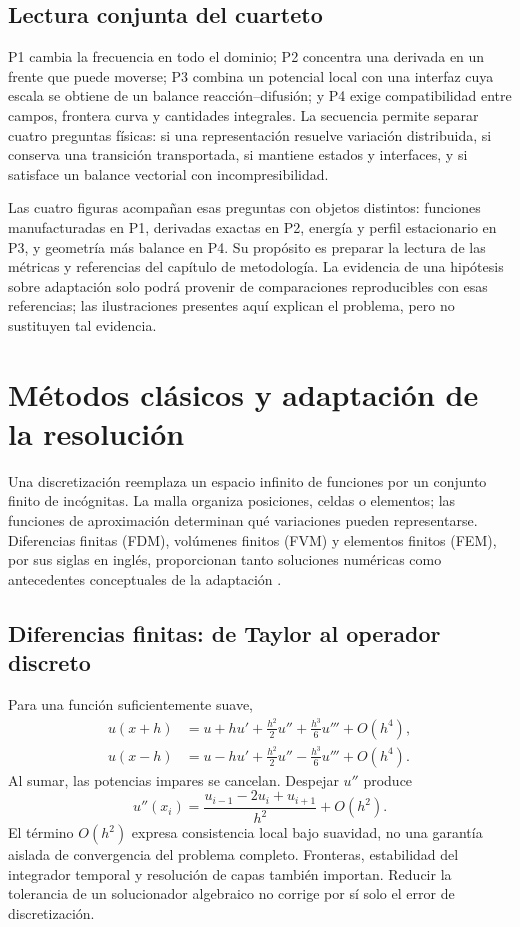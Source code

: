\subsection{Lectura conjunta del cuarteto}

P1 cambia la frecuencia en todo el dominio; P2 concentra una derivada en un
frente que puede moverse; P3 combina un potencial local con una interfaz cuya
escala se obtiene de un balance reacción--difusión; y P4 exige compatibilidad
entre campos, frontera curva y cantidades integrales. La secuencia permite
separar cuatro preguntas físicas: si una representación resuelve variación
distribuida, si conserva una transición transportada, si mantiene estados y
interfaces, y si satisface un balance vectorial con incompresibilidad.

Las cuatro figuras acompañan esas preguntas con objetos distintos: funciones
manufacturadas en P1, derivadas exactas en P2, energía y perfil estacionario
en P3, y geometría más balance en P4. Su propósito es preparar la lectura de
las métricas y referencias del capítulo de metodología. La evidencia de una
hipótesis sobre adaptación solo podrá provenir de comparaciones reproducibles
con esas referencias; las ilustraciones presentes aquí explican el problema,
pero no sustituyen tal evidencia.


\section{Métodos clásicos y adaptación de la resolución}
Una discretización reemplaza un espacio infinito de funciones por un conjunto finito de incógnitas. La malla organiza posiciones, celdas o elementos; las funciones de aproximación determinan qué variaciones pueden representarse. Diferencias finitas (FDM), volúmenes finitos (FVM) y elementos finitos (FEM), por sus siglas en inglés, proporcionan tanto soluciones numéricas como antecedentes conceptuales de la adaptación \cite{fenics2016}.

\subsection{Diferencias finitas: de Taylor al operador discreto}
Para una función suficientemente suave,
\begin{align}
u(x+h)&=u+hu'+\tfrac{h^2}{2}u''+\tfrac{h^3}{6}u'''+O(h^4),\\
u(x-h)&=u-hu'+\tfrac{h^2}{2}u''-\tfrac{h^3}{6}u'''+O(h^4).
\end{align}
Al sumar, las potencias impares se cancelan. Despejar $u''$ produce
\begin{equation}
u''(x_i)=\frac{u_{i-1}-2u_i+u_{i+1}}{h^2}+O(h^2).
\end{equation}
El término $O(h^2)$ expresa consistencia local bajo suavidad, no una garantía aislada de convergencia del problema completo. Fronteras, estabilidad del integrador temporal y resolución de capas también importan. Reducir la tolerancia de un solucionador algebraico no corrige por sí solo el error de discretización.

